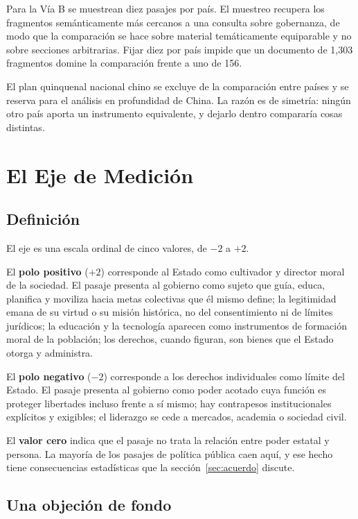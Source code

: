 Para la Vía B se muestrean diez pasajes por país. El muestreo recupera los fragmentos semánticamente más cercanos a una consulta sobre gobernanza, de modo que la comparación se hace sobre material temáticamente equiparable y no sobre secciones arbitrarias. Fijar diez por país impide que un documento de 1{,}303 fragmentos domine la comparación frente a uno de 156.

El plan quinquenal nacional chino se excluye de la comparación entre países y se reserva para el análisis en profundidad de China. La razón es de simetría: ningún otro país aporta un instrumento equivalente, y dejarlo dentro compararía cosas distintas.

\section{El Eje de Medición}

\subsection{Definición}

El eje \ejedf es una escala ordinal de cinco valores, de $-2$ a $+2$.

El \textbf{polo positivo} ($+2$) corresponde al Estado como cultivador y director moral de la sociedad. El pasaje presenta al gobierno como sujeto que guía, educa, planifica y moviliza hacia metas colectivas que él mismo define; la legitimidad emana de su virtud o su misión histórica, no del consentimiento ni de límites jurídicos; la educación y la tecnología aparecen como instrumentos de formación moral de la población; los derechos, cuando figuran, son bienes que el Estado otorga y administra.

El \textbf{polo negativo} ($-2$) corresponde a los derechos individuales como límite del Estado. El pasaje presenta al gobierno como poder acotado cuya función es proteger libertades incluso frente a sí mismo; hay contrapesos institucionales explícitos y exigibles; el liderazgo se cede a mercados, academia o sociedad civil.

El \textbf{valor cero} indica que el pasaje no trata la relación entre poder estatal y persona. La mayoría de los pasajes de política pública caen aquí, y ese hecho tiene consecuencias estadísticas que la sección~\ref{sec:acuerdo} discute.

\subsection{Una objeción de fondo}
\label{sec:objecion-eje}

